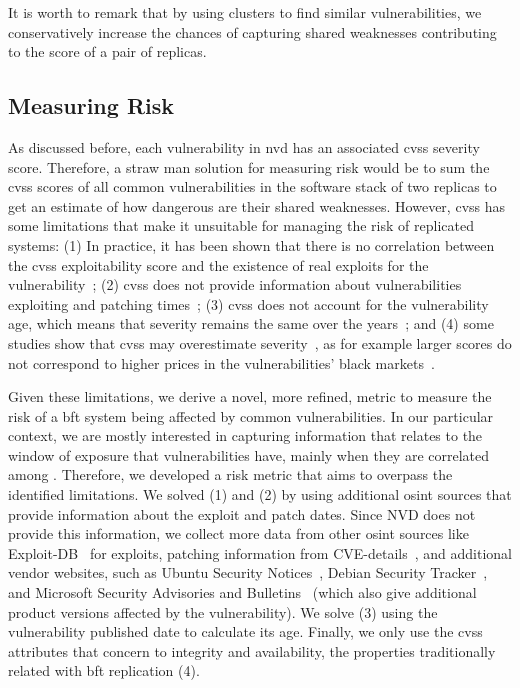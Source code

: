 It is worth to remark that by using clusters to find similar vulnerabilities, we conservatively increase the chances of capturing shared weaknesses contributing to the score of a pair of replicas.

\subsection{Measuring Risk}
\label{sec:measurerisk}

As discussed before, each vulnerability in \gls{nvd} has an associated \gls{cvss} severity score. 
Therefore, a straw man solution for measuring risk would be to sum the \gls{cvss} scores of all common vulnerabilities in the software stack of two replicas to get an estimate of how dangerous are their shared weaknesses.
However, \gls{cvss} has some limitations that make it unsuitable for managing the risk of replicated systems:
(1) In practice, it has been shown that there is no correlation between the \gls{cvss} exploitability score and the existence of real exploits for the vulnerability~\cite{Bozorgi:2010}; 
(2) \gls{cvss} does not provide information about vulnerabilities exploiting and patching times~\cite{Nappa:2015}; 
(3) \gls{cvss} does not account for the vulnerability age, which means that severity remains the same over the years~\cite{Frei:2006,Melo:2013}; 
and (4) some studies show that \gls{cvss} may overestimate severity~\cite{Sabottke:2015}, as for example larger scores do not correspond to higher prices in the vulnerabilities' black markets~\cite{Allodi:2014,Allodi:2017}.

Given these limitations, we derive a novel, more refined, metric to measure the risk of a \gls{bft} system being affected by common vulnerabilities.
In our particular context, we are mostly interested in capturing information that relates to the window of exposure that vulnerabilities have, mainly when they are correlated among \replicas.
Therefore, we developed a risk metric that aims to overpass the identified limitations. 
We solved (1) and (2) by using additional \gls{osint} sources that provide information about the exploit and patch dates. 
Since NVD does not provide this information, we collect more data from other \gls{osint} sources like Exploit-DB~\cite{edb} for exploits, patching information from CVE-details~\cite{cvedetails}, and additional vendor websites, such as Ubuntu Security Notices~\cite{ubuntu}, Debian Security Tracker~\cite{debian}, and Microsoft Security Advisories and Bulletins~\cite{microsoft} (which also give additional product versions affected by the vulnerability).
We solve (3) using the vulnerability published date to calculate its age.
Finally, we only use the \gls{cvss} attributes that concern to integrity and availability, the properties traditionally related with \gls{bft} replication (4).


